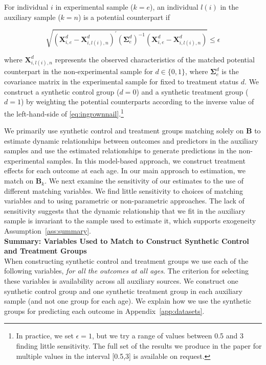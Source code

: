 \onehalfspacing
\begin{algorithm} \label{alg:match}
For individual $i$ in experimental sample ($k=e$), an individual $l(i)$ in the auxiliary sample ($k=n$) is a potential counterpart if

\begin{equation}\label{eq:ingrownnail}
\sqrt{(\bm{X}^d_{i,e} - \bm{X}^d_{i,l(i),n})^\prime (\bm{\Sigma}^d_e)^{-1} (\bm{X}^d_{i,e} - \bm{X}^d_{i,l(i),n})} \leq \epsilon
\end{equation}

\noindent where $\bm{X}^d_{i,l(i),n}$ represents the observed characteristics of the matched potential counterpart in the non-experimental sample for $d \in \{0,1\}$, where $\bm{\Sigma}^d_e$ is the covariance matrix in the experimental sample for fixed to treatment status $d$. We construct a synthetic control group ($d = 0$) and a synthetic treatment group ($d = 1$) by weighting the potential counterparts according to the inverse value of the left-hand-side of \eqref{eq:ingrownnail}.\footnote{In practice, we set $\epsilon = 1$, but we try a range of values between 0.5 and 3 finding little sensitivity. The full set of the results we produce in the paper for multiple values in the interval [0.5,3] is available on request.}
\end{algorithm}
\doublespacing

\noindent We primarily use synthetic control and treatment groups matching solely on $\bm{B}$ to estimate dynamic relationships between outcomes and predictors in the auxiliary samples and use the estimated relationships to generate predictions in the non-experimental samples. In this model-based approach, we construct treatment effects for each outcome at each age. In our main approach to estimation, we match on $\bm{B}_k$. We next examine the sensitivity of our estimates to the use of different matching variables. We find little sensitivity to choices of matching variables and to using parametric or non-parametric approaches. The lack of sensitivity suggests that the dynamic relationship that we fit in the auxiliary sample is invariant to the sample used to estimate it, which supports exogeneity Assumption~\ref{ass:summary}.\\


\noindent \textbf{Summary: Variables Used to Match to Construct Synthetic Control and Treatment Groups}\\
When constructing synthetic control and treatment groups we use each of the following variables, \textit{for all the outcomes at all ages}. The criterion for selecting these variables is availability across all auxiliary sources. We construct one synthetic control group and one synthetic treatment group in each auxiliary sample (and not one group for each age). We explain how we use the synthetic groups for predicting each outcome in Appendix~\ref{app:datasets}.


